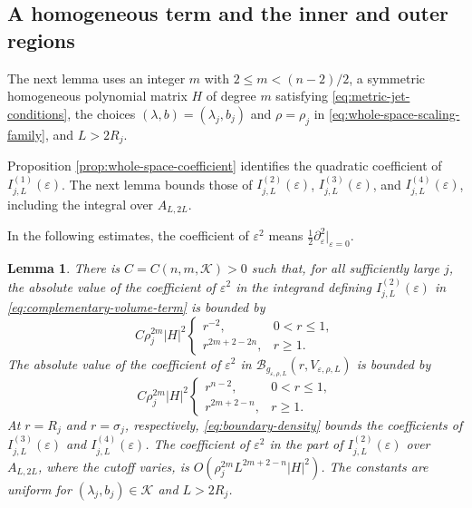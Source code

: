 \documentclass[11pt]{article}
\numberwithin{equation}{section}
\newtheorem{lemma}[theorem]{Lemma}
\theoremstyle{remark}
\newcommand{\eps}{\varepsilon}
\begin{document}
\subsection{A homogeneous term and the inner and outer regions}

The next lemma uses an integer \(m\) with \(2\le m<(n-2)/2\), a symmetric
homogeneous polynomial matrix \(H\) of degree \(m\) satisfying
\eqref{eq:metric-jet-conditions}, the choices
\((\lambda,b)=(\lambda_j,b_j)\) and \(\rho=\rho_j\) in
\eqref{eq:whole-space-scaling-family}, and \(L>2R_j\).

Proposition  \ref{prop:whole-space-coefficient} identifies the quadratic
coefficient of \(I_{j,L}^{(1)}(\eps)\). The next lemma bounds those of
\(I_{j,L}^{(2)}(\eps)\), \(I_{j,L}^{(3)}(\eps)\), and
\(I_{j,L}^{(4)}(\eps)\), including the integral over \(A_{L,2L}\).

In the following estimates, the coefficient of \(\eps^2\) means
\(\frac{1}{2}\partial_\eps^2|_{\eps=0}\).
\begin{lemma}\label{lem:finite-annulus-coefficient-bounds}
There is \(C=C(n,m,\mathcal K)>0\) such that, for all sufficiently large
\(j\), the absolute value of the coefficient of \(\eps^2\) in the
integrand defining \(I_{j,L}^{(2)}(\eps)\) in
\eqref{eq:complementary-volume-term} is bounded by
\begin{equation}\label{eq:complement-density}
 C\rho_j^{2m}|H|^2
 \begin{cases}
  r^{-2},&0<r\le1,\\
  r^{2m+2-2n},&r\ge1.
 \end{cases}
\end{equation}
The absolute value of the coefficient of \(\eps^2\) in
\(\mathcal B_{g_{\eps,\rho,L}}(r,V_{\eps,\rho,L})\) is bounded by
\begin{equation}\label{eq:boundary-density}
 C\rho_j^{2m}|H|^2
 \begin{cases}
  r^{n-2},&0<r\le1,\\
  r^{2m+2-n},&r\ge1.
 \end{cases}
\end{equation}
At \(r=R_j\) and \(r=\sigma_j\), respectively,
\eqref{eq:boundary-density} bounds the coefficients of
\(I_{j,L}^{(3)}(\eps)\) and \(I_{j,L}^{(4)}(\eps)\).
The coefficient of \(\eps^2\) in the part of \(I_{j,L}^{(2)}(\eps)\) over
\(A_{L,2L}\), where the cutoff varies, is
\(O(\rho_j^{2m}L^{2m+2-n}|H|^2)\). The constants are
uniform for \((\lambda_j,b_j)\in\mathcal K\) and \(L>2R_j\).
\end{lemma}
\end{document}
